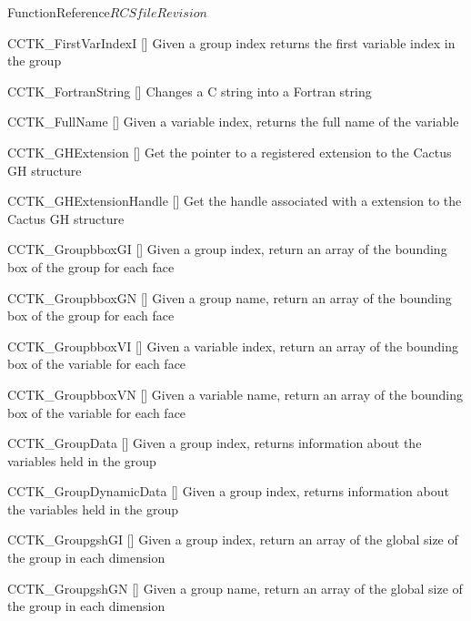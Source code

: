 \begin{cactuspart}{FunctionReference}{$RCSfile$}{$Revision$}
\begin{Lentry}
\item[CCTK\_FirstVarIndexI]
  [\pageref{CCTK-FirstVarIndexI}]
  Given a group index returns the first variable index in the group

\item[CCTK\_FortranString]
  [\pageref{CCTK-FortranString}]
  Changes a C string into a Fortran string

\item[CCTK\_FullName]
  [\pageref{CCTK-FullName}]
  Given a variable index, returns the full name of the variable

\item[CCTK\_GHExtension]
  [\pageref{CCTK-GHExtension}]
  Get the pointer to a registered extension to the Cactus GH structure

\item[CCTK\_GHExtensionHandle]
  [\pageref{CCTK-GHExtensionHandle}]
  Get the handle associated with a extension to the Cactus GH structure

\item[CCTK\_GroupbboxGI] [\pageref{CCTK-GroupbboxGI}]
  Given a group index, return an array of the bounding box of the group for each face

\item[CCTK\_GroupbboxGN] [\pageref{CCTK-GroupbboxGN}]
  Given a group name, return an array of the bounding box of the group for each face

\item[CCTK\_GroupbboxVI] [\pageref{CCTK-GroupbboxVI}]
  Given a variable index, return an array of the bounding box of the variable for each face

\item[CCTK\_GroupbboxVN] [\pageref{CCTK-GroupbboxVN}]
  Given a variable name, return an array of the bounding box of the variable for each face

\item[CCTK\_GroupData]
  [\pageref{CCTK-GroupData}]
  Given a group index, returns information about the variables held in the group

\item[CCTK\_GroupDynamicData]
  [\pageref{CCTK-GroupDynamicData}]
  Given a group index, returns information about the variables held in the group

\item[CCTK\_GroupgshGI] [\pageref{CCTK-GroupgshGI}]
  Given a group index, return an array of the global size of the group in each dimension

\item[CCTK\_GroupgshGN] [\pageref{CCTK-GroupgshGN}]
  Given a group name, return an array of the global size of the group in each dimension


\end{Lentry}
\end{cactuspart}
